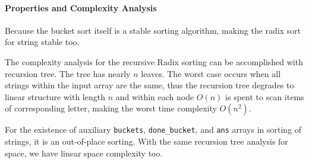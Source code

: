 \documentclass[../main.tex]{subfiles}
\begin{document}
\paragraph{Properties and Complexity Analysis} 
Because the bucket sort itself is a stable sorting algorithm, making the radix sort for string stable too.

The complexity analysis for the recursive Radix sorting can be accomplished with recursion tree. The tree has nearly $n$ leaves. The worst case occurs when all strings within the input array are the same, thus the recursion tree degrades to linear structure with length $n$ and within each node $O(n)$ is spent to scan items of corresponding letter, making the worst time complexity $O(n^2)$.  

For the existence of auxiliary \texttt{buckets}, \texttt{done\_bucket}, and \texttt{ans} arrays in sorting of strings, it is an out-of-place sorting. With the same recursion tree analysis for space, we have linear space complexity too. 







 
\end{document}
